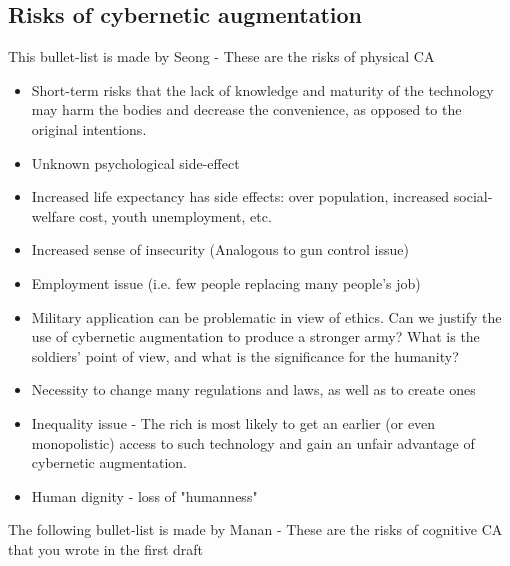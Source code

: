 \subsection{Risks of cybernetic augmentation}
{\color{red} This bullet-list is made by Seong - These are the risks of physical CA}


\begin{itemize}
	\item Short-term risks that the lack of knowledge and maturity of the technology may harm the bodies and decrease the convenience, as opposed to the original intentions.
	\item Unknown psychological side-effect
	\item Increased life expectancy has side effects: over population, increased social-welfare cost, youth unemployment, etc.
	\item Increased sense of insecurity (Analogous to gun control issue)
	\item Employment issue (i.e. few people replacing many people's job)
	\item Military application can be problematic in view of ethics. Can we justify the use of cybernetic augmentation to produce a stronger army? What is the soldiers' point of view, and what is the significance for the humanity?
	\item Necessity to change many regulations and laws, as well as to create ones
	\item Inequality issue - The rich is most likely to get an earlier (or even monopolistic) access to such technology and gain an unfair advantage of cybernetic augmentation.
	\item Human dignity - loss of "humanness"
	
\end{itemize}

{\color{red} The following bullet-list is made by Manan - These are the risks of cognitive CA that you wrote in the first draft}

